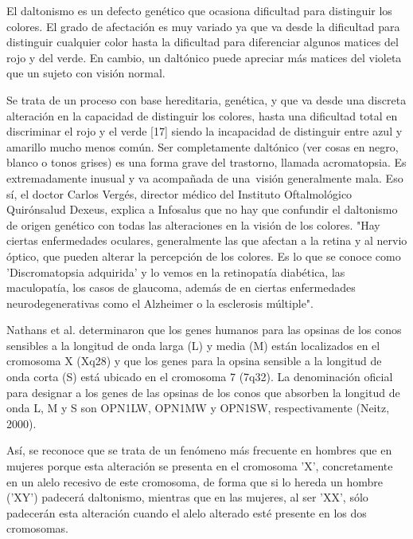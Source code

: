 \documentclass[10pt]{article}
\begin{document}
El daltonismo es un defecto genético que ocasiona dificultad para distinguir los colores. El grado de afectación es muy variado ya que va desde la dificultad para distinguir cualquier color hasta la dificultad para diferenciar algunos matices del rojo y del verde. En cambio, un daltónico puede apreciar más matices del violeta que un sujeto con visión normal\cite{IEEEreferencias:Ref28}.

Se trata de un proceso con base hereditaria, genética, y que va desde una discreta alteración en la capacidad de distinguir los colores, hasta una dificultad total en discriminar el rojo y el verde [17] siendo la incapacidad de distinguir entre azul y amarillo mucho menos común. Ser completamente daltónico (ver cosas en negro, blanco o tonos grises) es una forma grave del trastorno, llamada acromatopsia. Es extremadamente inusual y va acompañada de una visión generalmente mala\cite{IEEEreferencias:Ref29}.
Eso sí, el doctor Carlos Vergés, director médico del Instituto Oftalmológico Quirónsalud Dexeus, explica a Infosalus que no hay que confundir el daltonismo de origen genético con todas las alteraciones en la visión de los colores.    "Hay ciertas enfermedades oculares, generalmente las que afectan a la retina y al nervio óptico, que pueden alterar la percepción de los colores. Es lo que se conoce como 'Discromatopsia adquirida' y lo vemos en la retinopatía diabética, las maculopatía,  los casos de glaucoma, además de en ciertas enfermedades neurodegenerativas como el Alzheimer o la esclerosis múltiple"\cite{IEEEreferencias:Ref26}.

Nathans et al. determinaron que los genes humanos para las opsinas de los conos sensibles a la longitud de onda larga (L) y media (M) están localizados en el cromosoma X (Xq28) y que los genes para la opsina sensible a la longitud de onda corta (S) está ubicado en el cromosoma 7 (7q32). La denominación oficial para designar a los genes de las opsinas de los conos que absorben la longitud de onda L, M y S son OPN1LW, OPN1MW y OPN1SW, respectivamente (Neitz, 2000)\cite{IEEEreferencias:Ref30}.

Así, se reconoce que se trata de un fenómeno más frecuente en hombres que en mujeres porque esta alteración se presenta en el cromosoma 'X', concretamente en un alelo recesivo de este cromosoma, de forma que si lo hereda un hombre ('XY') padecerá daltonismo, mientras que en las mujeres, al ser 'XX', sólo padecerán esta alteración cuando el alelo alterado esté presente en los dos cromosomas\cite{IEEEreferencias:Ref26}.
\end{document}
